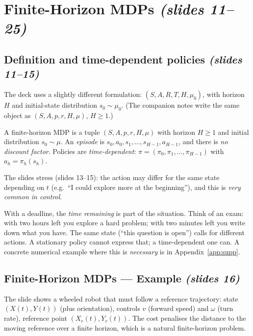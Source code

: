 \documentclass[11pt,a4paper]{article}
\newcommand{\slides}[1]{\emph{(slides #1)}}
\theoremstyle{plain}
\theoremstyle{definition}
\theoremstyle{remark}
\begin{document}
\section{Finite-Horizon MDPs \slides{11--25}}

\subsection{Definition and time-dependent policies \slides{11--15}}

The deck uses a slightly different formulation: $(S,A,R,T,H,\mu_0)$, with horizon $H$ and initial-state distribution $s_0\sim\mu_0$. (The companion notes write the same object as $(S,A,p,r,H,\mu)$, $H\ge 1$.)

\begin{definition}\label{def:fhmdp}
A finite-horizon MDP is a tuple $(S,A,p,r,H,\mu)$ with horizon $H\ge1$ and initial distribution $s_0\sim\mu$. An \emph{episode} is $s_0,a_0,s_1,\dots,s_{H-1},a_{H-1}$, and there is \emph{no discount factor}. Policies are \emph{time-dependent}: $\pi=(\pi_0,\pi_1,\dots,\pi_{H-1})$ with $a_h=\pi_h(s_h)$.
\end{definition}

The slides stress (slides 13--15): the action may differ for the same state depending on $t$ (e.g.\ ``I could explore more at the beginning''), and this is \emph{very common in control}.

\begin{intuition}
With a deadline, the \emph{time remaining} is part of the situation. Think of an exam: with two hours left you explore a hard problem; with two minutes left you write down what you have. The same state (``this question is open'') calls for different actions. A stationary policy cannot express that; a time-dependent one can. A concrete numerical example where this is \emph{necessary} is in Appendix~\ref{app:supp}.
\end{intuition}

\subsection{Finite-Horizon MDPs --- Example \slides{16}}

The slide shows a wheeled robot that must follow a reference trajectory: state $(X(t),Y(t))$ (plus orientation), controls $v$ (forward speed) and $\omega$ (turn rate), reference point $(X_r(t),Y_r(t))$. The cost penalises the distance to the moving reference over a finite horizon, which is a natural finite-horizon problem.
\end{document}
